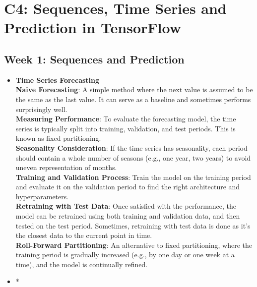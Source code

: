 \documentclass[20pt]{article}
\newcommand{\speciallink}[2]{\textbf{\textcolor{red}{\href{#1}{#2}}}}
\begin{document}
	\section{C4: Sequences, Time Series and Prediction in TensorFlow}
	\subsection{Week 1: Sequences and Prediction}
	\begin{itemize}
		\item \textbf{Time Series Forecasting}\\
		\textbf{Naive Forecasting}: A simple method where the next value is assumed to be the same as the last value. It can serve as a baseline and sometimes performs surprisingly well.\\
		\textbf{Measuring Performance}: To evaluate the forecasting model, the time series is typically split into training, validation, and test periods. This is known as fixed partitioning.\\
		\textbf{Seasonality Consideration}: If the time series has seasonality, each period should contain a whole number of seasons (e.g., one year, two years) to avoid uneven representation of months.\\
		\textbf{Training and Validation Process}: Train the model on the training period and evaluate it on the validation period to find the right architecture and hyperparameters.\\
		\textbf{Retraining with Test Data}: Once satisfied with the performance, the model can be retrained using both training and validation data, and then tested on the test period. Sometimes, retraining with test data is done as it's the closest data to the current point in time.\\
		\textbf{Roll-Forward Partitioning}: An alternative to fixed partitioning, where the training period is gradually increased (e.g., by one day or one week at a time), and the model is continually refined.\\
		\item *
		
		
		
		
		
	\end{itemize}
\end{document}
